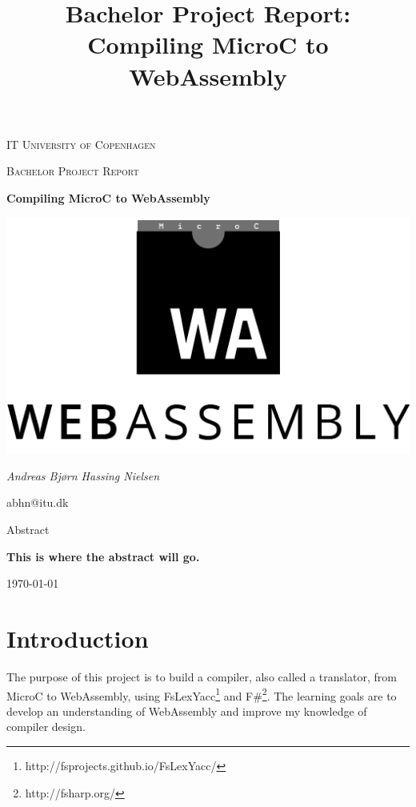 \documentclass[a4paper]{article}
\title{Bachelor Project Report: Compiling MicroC to WebAssembly}
\begin{document}
\begin{titlepage}
	\centering
	{\scshape\LARGE IT University of Copenhagen \par}
	\vspace{1cm}
	{\scshape\Large Bachelor Project Report\par}
	\vspace{1.5cm}
	{\huge\bfseries Compiling MicroC to WebAssembly \par}
	\vspace{2cm}
	{\includegraphics{web-assembly-logo-black-512px} \par}
	\vspace{2cm}
	{\Large\itshape Andreas Bjørn Hassing Nielsen\par}
	abhn@itu.dk\\
	\vspace{2cm}
	{\Large Abstract\par}
	{\bfseries This is where the abstract will go.}
	\vfill
	{\large \today\par}
\end{titlepage}

\newpage

\tableofcontents
\newpage


\section{Introduction}
The purpose of this project is to build a compiler, also called a translator, from MicroC to WebAssembly, using FsLexYacc\footnote{\label{footnote:fslexyacc-url}http://fsprojects.github.io/FsLexYacc/} and F\#\footnote{http://fsharp.org/}. The learning goals are to develop an understanding of WebAssembly and improve my knowledge of compiler design.
\end{document}
